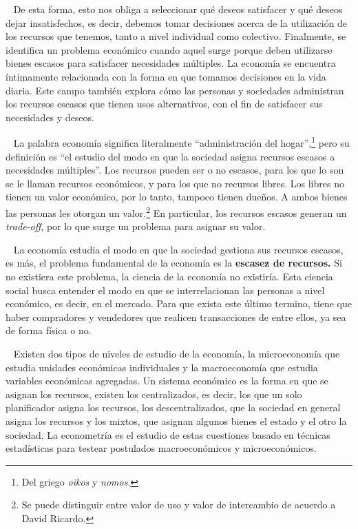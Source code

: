 \documentclass[
  letterpaper,
  DIV=11,
  numbers=noendperiod]{scrreport}
\begin{document}
~ De esta forma, esto nos obliga a seleccionar qué deseos satisfacer y
qué deseos dejar insatisfechos, es decir, debemos tomar decisiones
acerca de la utilización de los recursos que tenemos, tanto a nivel
individual como colectivo. Finalmente, se identifica un problema
económico cuando aquel surge porque deben utilizarse bienes escasos para
satisfacer necesidades múltiples. La economía se encuentra íntimamente
relacionada con la forma en que tomamos decisiones en la vida diaria.
Este campo también explora cómo las personas y sociedades administran
los recursos escasos que tienen usos alternativos, con el fin de
satisfacer sus necesidades y deseos.

~ La palabra economía significa literalmente ``administración del
hogar'',\footnote{Del griego \emph{oikos} y \emph{nomos}.} pero su
definición es ``el estudio del modo en que la sociedad asigna recursos
escasos a necesidades múltiples''. Los recursos pueden ser o no escasos,
para los que lo son se le llaman recursos económicos, y para los que no
recursos libres. Los libres no tienen un valor económico, por lo tanto,
tampoco tienen dueños. A ambos bienes las personas les otorgan un
valor.\footnote{Se puede distinguir entre valor de uso y valor de intercambio de acuerdo a David Ricardo.}
En particular, los recursos escasos generan un \emph{trade-off}, por lo
que surge un problema para asignar su valor.

~ La economía estudia el modo en que la sociedad gestiona sus recursos
escasos, es más, el problema fundamental de la economía es la
\textbf{escasez de recursos.} Si no existiera este problema, la ciencia
de la economía no existiría. Esta ciencia social busca entender el modo
en que se interrelacionan las personas a nivel económico, es decir, en
el mercado. Para que exista este último termino, tiene que haber
compradores y vendedores que realicen transacciones de entre ellos, ya
sea de forma física o no.

~ Existen dos tipos de niveles de estudio de la economía, la
microeconomía que estudia unidades económicas individuales y la
macroeconomía que estudia variables económicas agregadas. Un sistema
económico es la forma en que se asignan los recursos, existen los
centralizados, es decir, los que un solo planificador asigna los
recursos, los descentralizados, que la sociedad en general asigna los
recursos y los mixtos, que asignan algunos bienes el estado y el otro la
sociedad. La econometría es el estudio de estas cuestiones basado en
técnicas estadísticas para testear postulados macroeconómicos y
microeconómicos.
\end{document}
